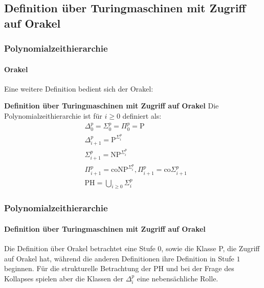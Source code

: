 \subsection{Definition über Turingmaschinen mit Zugriff auf Orakel}
\begin{frame}
    \frametitle{Polynomialzeithierarchie}
    \framesubtitle{Orakel}
    Eine weitere Definition bedient sich der Orakel:
    \begin{block}{\textbf{Definition über Turingmaschinen mit Zugriff auf Orakel}}
        Die Polynomialzeithierarchie ist für $i \geq 0$ definiert als:
        \begin{align*}
             & \Delta^p_0 = \Sigma^p_0 = \Pi^p_0 = \text{P} \\
             & \Delta^p_{i+1} = \text{P}^{\Sigma^p_i} \\
             &\Sigma^p_{i+1} = \text{NP}^{\Sigma^p_i} \\
             & \Pi^p_{i+1} = \text{coNP}^{\Sigma^p_i}, \Pi^p_{i+1} = \text{co}\Sigma^p_{i+1} \\
             & \text{PH} = \bigcup_{i \geq 0} \Sigma^p_i
        \end{align*}
    \end{block}
\end{frame}

\begin{frame}
    \frametitle{Polynomialzeithierarchie}
    \framesubtitle{Definition über Turingmaschinen mit Zugriff auf Orakel}
    Die Definition über Orakel betrachtet eine Stufe $0$, sowie die Klasse P, die Zugriff auf Orakel hat, während
    die anderen Definitionen ihre Definition in Stufe $1$ beginnen. Für die strukturelle Betrachtung der PH und bei der Frage des Kollapses spielen aber die Klassen der $\Delta^p_i$ eine nebensächliche Rolle.
\end{frame}

